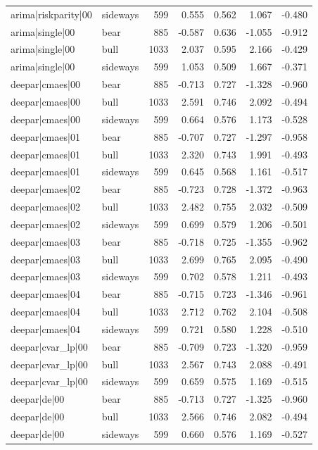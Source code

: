 \begin{table}
\begin{tabular}{llrrrrr}
arima|riskparity|00 & sideways & 599 & 0.555 & 0.562 & 1.067 & -0.480 \\
arima|single|00 & bear & 885 & -0.587 & 0.636 & -1.055 & -0.912 \\
arima|single|00 & bull & 1033 & 2.037 & 0.595 & 2.166 & -0.429 \\
arima|single|00 & sideways & 599 & 1.053 & 0.509 & 1.667 & -0.371 \\
deepar|cmaes|00 & bear & 885 & -0.713 & 0.727 & -1.328 & -0.960 \\
deepar|cmaes|00 & bull & 1033 & 2.591 & 0.746 & 2.092 & -0.494 \\
deepar|cmaes|00 & sideways & 599 & 0.664 & 0.576 & 1.173 & -0.528 \\
deepar|cmaes|01 & bear & 885 & -0.707 & 0.727 & -1.297 & -0.958 \\
deepar|cmaes|01 & bull & 1033 & 2.320 & 0.743 & 1.991 & -0.493 \\
deepar|cmaes|01 & sideways & 599 & 0.645 & 0.568 & 1.161 & -0.517 \\
deepar|cmaes|02 & bear & 885 & -0.723 & 0.728 & -1.372 & -0.963 \\
deepar|cmaes|02 & bull & 1033 & 2.482 & 0.755 & 2.032 & -0.509 \\
deepar|cmaes|02 & sideways & 599 & 0.699 & 0.579 & 1.206 & -0.501 \\
deepar|cmaes|03 & bear & 885 & -0.718 & 0.725 & -1.355 & -0.962 \\
deepar|cmaes|03 & bull & 1033 & 2.699 & 0.765 & 2.095 & -0.490 \\
deepar|cmaes|03 & sideways & 599 & 0.702 & 0.578 & 1.211 & -0.493 \\
deepar|cmaes|04 & bear & 885 & -0.715 & 0.723 & -1.346 & -0.961 \\
deepar|cmaes|04 & bull & 1033 & 2.712 & 0.762 & 2.104 & -0.508 \\
deepar|cmaes|04 & sideways & 599 & 0.721 & 0.580 & 1.228 & -0.510 \\
deepar|cvar\_lp|00 & bear & 885 & -0.709 & 0.723 & -1.320 & -0.959 \\
deepar|cvar\_lp|00 & bull & 1033 & 2.567 & 0.743 & 2.088 & -0.491 \\
deepar|cvar\_lp|00 & sideways & 599 & 0.659 & 0.575 & 1.169 & -0.515 \\
deepar|de|00 & bear & 885 & -0.713 & 0.727 & -1.325 & -0.960 \\
deepar|de|00 & bull & 1033 & 2.566 & 0.746 & 2.082 & -0.494 \\
deepar|de|00 & sideways & 599 & 0.660 & 0.576 & 1.169 & -0.527 \\

\end{tabular}
\end{table}

